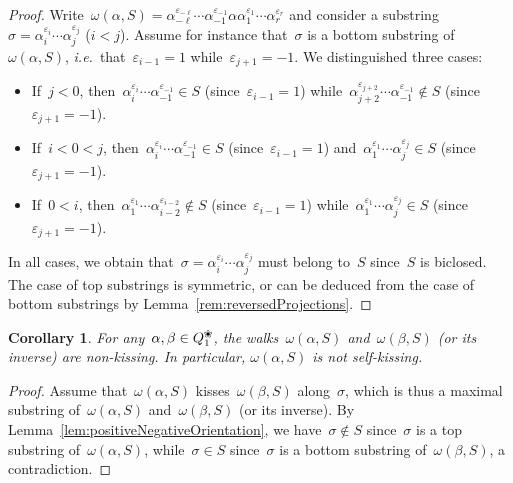 \documentclass{memo-l}
\newtheorem{corollary}[theorem]{Corollary}
\theoremstyle{definition}
\newcommand{\ie}{\textit{i.e.}~} %
\newcommand{\blossom}{^\text{\ding{96}}} %
\begin{document}
\begin{proof}
Write~$\omega(\alpha,S) = \alpha_{-\ell}^{\varepsilon_{-\ell}} \cdots \alpha_{-1}^{\varepsilon_{-1}} \alpha \alpha_1^{\varepsilon_1} \cdots \alpha_r^{\varepsilon_r}$ and consider a substring ${\sigma = \alpha_i^{\varepsilon_i} \cdots \alpha_j^{\varepsilon_j}}$ ($i < j$).
Assume for instance that~$\sigma$ is a bottom substring of~$\omega(\alpha,S)$, \ie that~$\varepsilon_{i-1} = 1$ while~$\varepsilon_{j+1} = -1$.
We distinguished three cases:
\begin{itemize}
\item If~$j < 0$, then~$\alpha_i^{\varepsilon_i} \cdots \alpha_{-1}^{\varepsilon_{-1}} \in S$ (since~$\varepsilon_{i-1} = 1$) while~$\alpha_{j+2}^{\varepsilon_{j+2}} \cdots \alpha_{-1}^{\varepsilon_{-1}} \notin S$ (since~$\varepsilon_{j+1} = -1$).
\item If~$i < 0 < j$, then~$\alpha_i^{\varepsilon_i} \cdots \alpha_{-1}^{\varepsilon_{-1}} \in S$  (since~$\varepsilon_{i-1} = 1$) and~$\alpha_1^{\varepsilon_1} \cdots \alpha_j^{\varepsilon_j} \in S$ (since~${\varepsilon_{j+1} = -1}$).
\item If~$0 < i$, then~$\alpha_1^{\varepsilon_1} \cdots \alpha_{i-2}^{\varepsilon_{i-2}} \notin S$ (since~$\varepsilon_{i-1} = 1$) while~$\alpha_1^{\varepsilon_1} \cdots \alpha_j^{\varepsilon_j} \in S$ (since~$\varepsilon_{j+1} = -1$).
\end{itemize}
In all cases, we obtain that~$\sigma = \alpha_i^{\varepsilon_i} \cdots \alpha_j^{\varepsilon_j}$ must belong to~$S$ since~$S$ is biclosed.
The case of top substrings is symmetric, or can be deduced from the case of bottom substrings by Lemma~\ref{rem:reversedProjections}.
\end{proof}

\begin{corollary}
\label{coro:surjectionNonKissingWalks}
For any~$\alpha, \beta \in Q_1\blossom$, the walks~$\omega(\alpha,S)$ and~$\omega(\beta,S)$ (or its inverse) are non-kissing.
In particular, $\omega(\alpha,S)$ is not self-kissing.
\end{corollary}

\begin{proof}
Assume that~$\omega(\alpha,S)$ kisses~$\omega(\beta,S)$ along~$\sigma$, which is thus a maximal substring of~$\omega(\alpha,S)$ and~$\omega(\beta,S)$ (or its inverse).
By Lemma~\ref{lem:positiveNegativeOrientation}, we have~$\sigma \notin S$ since~$\sigma$ is a top substring of~$\omega(\alpha,S)$, while~$\sigma \in S$ since~$\sigma$ is a bottom substring of~$\omega(\beta,S)$, a contradiction.
\end{proof}
\end{document}
